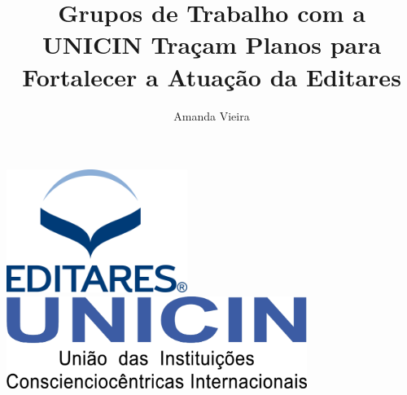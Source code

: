 \documentclass{gescons}
\author{Amanda Vieira}
\title{Grupos de Trabalho com a UNICIN Traçam Planos para Fortalecer a Atuação da Editares}
\begin{document}
    \makeentrevistatitle



\begin{center}
    \hspace{0.5cm}
    \includegraphics[height=4cm]{images/Logo-Editares-com-Marca-Registrada.png}
    \hspace{1cm}
    \includegraphics[height=3cm]{images/Unicin-Logo-1024x315.png} 
\end{center}
\end{document}

